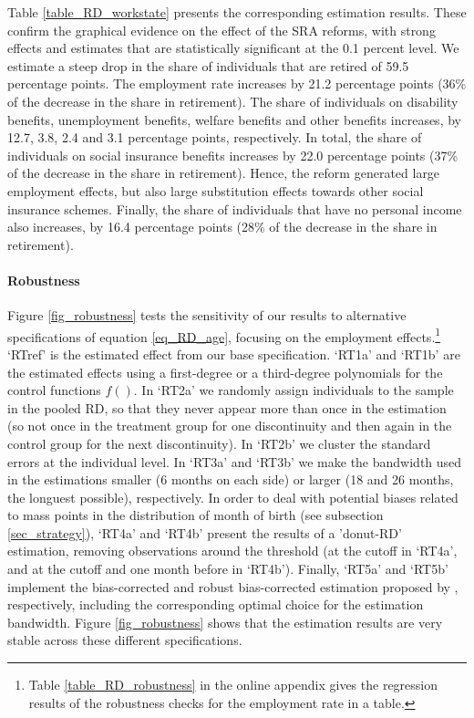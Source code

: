 \documentclass[12pt,a4paper]{article}
\begin{document}
Table \ref{table_RD_workstate} presents the corresponding estimation results. These confirm the graphical evidence on the effect of the SRA reforms, with strong effects and estimates that are statistically significant at the 0.1 percent level. We estimate a steep drop in the share of individuals that are retired of 59.5 percentage points. The employment rate increases by 21.2 percentage points (36\% of the decrease in the share in retirement). The share of individuals on disability benefits, unemployment benefits, welfare benefits and other benefits increases, by 12.7, 3.8, 2.4 and 3.1 percentage points, respectively. In total, the share of individuals on social insurance benefits increases by 22.0 percentage points (37\% of the decrease in the share in retirement).
Hence, the reform generated large employment effects, but also large substitution effects towards other social insurance schemes. Finally, the share of individuals that have no personal income also increases, by 16.4 percentage points (28\% of the decrease in the share in retirement).

\paragraph{Robustness}

Figure \ref{fig_robustness} tests the sensitivity of our results to alternative specifications of equation \ref{eq_RD_age}, focusing on the employment effects.\footnote{Table \ref{table_RD_robustness} in the online appendix gives the regression results of the robustness checks for the employment rate in a table. %
} `RTref' is the estimated effect from our base specification. `RT1a' and `RT1b' are the estimated effects using a first-degree or a third-degree polynomials for the control functions $f()$. In `RT2a' we randomly assign individuals to the sample in the pooled RD, so that they never appear more than once in the estimation (so not once in the treatment group for one discontinuity and then again in the control group for the next discontinuity). In `RT2b' we cluster the standard errors at the individual level. In `RT3a' and `RT3b' we make the bandwidth used in the estimations smaller (6 months on each side) or larger (18 and 26 months, the longuest possible), respectively. In order to deal with potential biases related to mass points in the distribution of month of birth (see subsection \ref{sec_strategy}), `RT4a' and `RT4b' present the results of a 'donut-RD' estimation, removing observations around the threshold (at the cutoff in `RT4a', and at the cutoff and one month before in `RT4b'). Finally, `RT5a' and `RT5b' implement the bias-corrected and robust bias-corrected estimation %
proposed by \cite{calonico2014robust}, respectively, including the corresponding optimal choice for the estimation bandwidth. Figure \ref{fig_robustness} shows that the estimation results are very stable across these different specifications.
\end{document}
